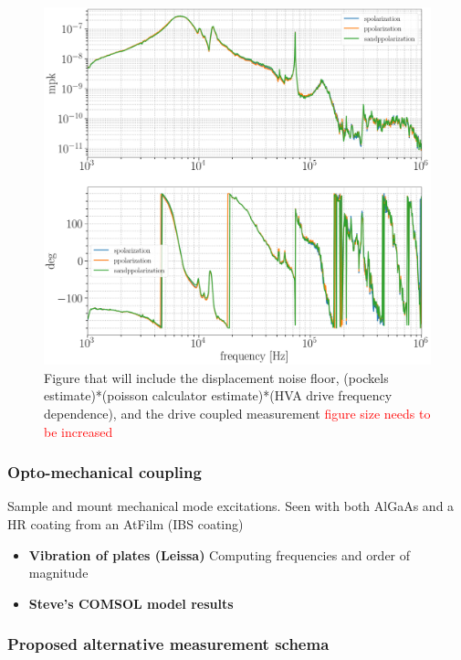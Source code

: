 \begin{figure}[H]
\includegraphics[width=\textwidth]{figs/ALGAAS/cav_polarization_test.png}
\caption{Figure that will include the displacement noise floor, (pockels estimate)*(poisson calculator estimate)*(HVA drive frequency dependence), and the drive coupled measurement \textcolor{red}{figure size needs to be increased}}
\label{fig:measurement_sum}
\end{figure}

\subsubsection{Opto-mechanical coupling}
Sample and mount mechanical mode excitations. Seen with both AlGaAs and a HR coating from an AtFilm (IBS coating)
\begin{itemize}
\item \textbf{Vibration of plates (Leissa)} \cite{leissa} Computing frequencies and order of magnitude
\item \textbf{Steve's COMSOL model results}
\end{itemize}

\subsubsection{Proposed alternative measurement schema}
